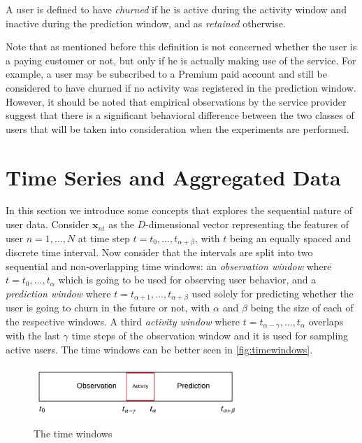 \documentclass{kththesis}
\begin{document}
\begin{definition}
\label{def:churn}
A user is defined to have \emph{churned} if he is active during the activity window and inactive during the prediction window, and as \emph{retained} otherwise.
\end{definition}

Note that as mentioned before this definition is not concerned whether the user is a paying customer or not, but only if he is actually making use of the service. For example, a user may be subscribed to a Premium paid account and still be considered to have churned if no activity was registered in the prediction window. However, it should be noted that empirical observations by the service provider suggest that there is a significant behavioral difference between the two classes of users that will be taken into consideration when the experiments are performed. 

\section{Time Series and Aggregated Data}
\label{sec:timewindows}

In this section we introduce some concepts that explores the sequential nature of user data. Consider $\mathbf{x}_{nt}$ as the $D$-dimensional vector representing the features of user $n=1,...,N$ at time step $t = t_0,...,t_{\alpha+\beta}$, with $t$ being an equally spaced and discrete time interval. Now consider that the intervals are split into two sequential and non-overlapping time windows: an \emph{observation window} where $t = t_0,...,t_\alpha$ which is going to be used for observing user behavior, and a \emph{prediction window} where $t = t_{\alpha+1},...,t_{\alpha+\beta}$ used solely for predicting whether the user is going to churn in the future or not, with $\alpha$ and $\beta$ being the size of each of the respective windows. A third \emph{activity window} where $t=t_{\alpha-\gamma},...,t_\alpha$ overlaps with the last $\gamma$ time steps of the observation window and it is used for sampling active users. The time windows can be better seen in \autoref{fig:timewindows}.

\begin{figure}[h]
    \centering
    \includegraphics[width=0.7\textwidth,keepaspectratio]{figures/timewindows.pdf}
    \caption{The time windows}
    \label{fig:timewindows}
\end{figure}
\end{document}
